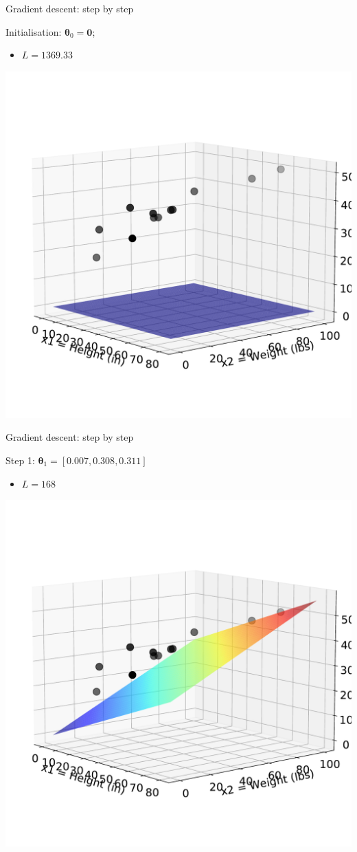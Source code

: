 \documentclass[ignorenonframetext,]{beamer}
\providecommand{\tightlist}{%
  \setlength{\itemsep}{0pt}\setlength{\parskip}{0pt}}
\newcommand{\vv}[1]{\boldsymbol{#1}}
\begin{document}
\begin{frame}{Gradient descent: step by step}
\protect\hypertarget{gradient-descent-step-by-step}{}

Initialisation: \(\vv{\theta}_0 = \vv{0}\);

\begin{itemize}
\tightlist
\item
  \(L = 1369.33\)
\end{itemize}

\begin{center}\includegraphics[width=0.5\linewidth]{lecture3_files/figure-beamer/unnamed-chunk-7-1} \end{center}

\end{frame}

\begin{frame}{Gradient descent: step by step}
\protect\hypertarget{gradient-descent-step-by-step-1}{}

Step 1: \(\vv{\theta}_1 = [0.007, 0.308, 0.311]\)

\begin{itemize}
\tightlist
\item
  \(L = 168\)
\end{itemize}

\begin{center}\includegraphics[width=0.5\linewidth]{lecture3_files/figure-beamer/unnamed-chunk-8-1} \end{center}

\end{frame}
\end{document}

